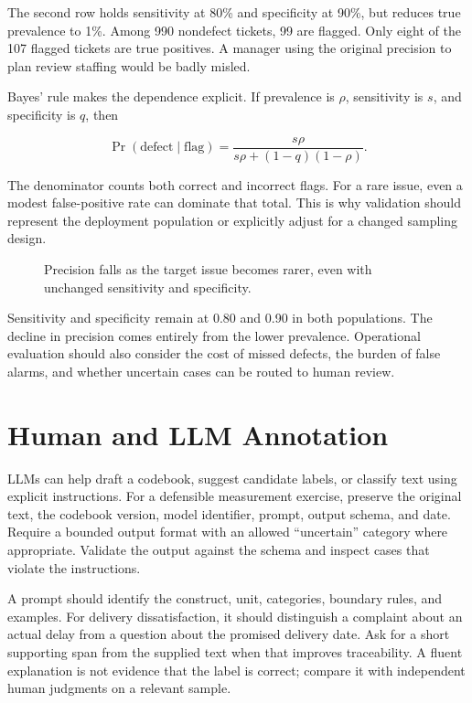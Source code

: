 The second row holds sensitivity at 80\% and specificity at 90\%, but
reduces true prevalence to 1\%. Among 990 nondefect tickets, 99 are
flagged. Only eight of the 107 flagged tickets are true positives. A
manager using the original precision to plan review staffing would be
badly misled.

Bayes' rule makes the dependence explicit. If prevalence is \(\rho\),
sensitivity is \(s\), and specificity is \(q\), then

\[
\Pr(\text{defect}\mid\text{flag})=\frac{s\rho}{s\rho+(1-q)(1-\rho)}.
\]

The denominator counts both correct and incorrect flags. For a rare
issue, even a modest false-positive rate can dominate that total. This
is why validation should represent the deployment population or
explicitly adjust for a changed sampling design.

\begin{figure}[htbp]
\centering

\caption{Precision falls as the target issue becomes rarer, even with unchanged sensitivity and specificity.}\label{fig:M05_prevalence}
\end{figure}

Sensitivity and specificity remain at 0.80 and 0.90 in both populations.
The decline in precision comes entirely from the lower prevalence.
Operational evaluation should also consider the cost of missed defects,
the burden of false alarms, and whether uncertain cases can be routed to
human review.

\hypertarget{M05-human-and-llm-annotation}{%
\section{Human and LLM Annotation}\label{M05-human-and-llm-annotation}}

\noindent LLMs can help draft a codebook, suggest candidate labels, or classify
text using explicit instructions. For a defensible measurement exercise,
preserve the original text, the codebook version, model identifier,
prompt, output schema, and date. Require a bounded output format with an
allowed ``uncertain'' category where appropriate. Validate the output
against the schema and inspect cases that violate the instructions.

A prompt should identify the construct, unit, categories, boundary
rules, and examples. For delivery dissatisfaction, it should distinguish
a complaint about an actual delay from a question about the promised
delivery date. Ask for a short supporting span from the supplied text
when that improves traceability. A fluent explanation is not evidence
that the label is correct; compare it with independent human judgments
on a relevant sample.


